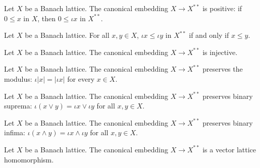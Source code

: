 \begin{theorem}
\label{thm:bidualSpace-inclusion-nonneg}
\leanok
{}
Let $X$ be a Banach lattice. The canonical embedding $X \to
X^{**}$ is positive: if $0 \le x$ in $X$, then $0 \le \iota x$
in $X^{**}$.
\end{theorem}

\begin{theorem}
\label{thm:bidualSpace-inclusion-le-inclusion-iff}
\leanok
{}
Let $X$ be a Banach lattice. For all $x, y \in X$, $\iota x \le
\iota y$ in $X^{**}$ if and only if $x \le y$.
\end{theorem}

\begin{theorem}
\label{thm:bidualSpace-inclusion-injective}
\leanok
{}
Let $X$ be a Banach lattice. The canonical embedding $X \to
X^{**}$ is injective.
\end{theorem}

\begin{theorem}
\label{thm:bidualSpace-inclusion-abs}
\leanok
{}
Let $X$ be a Banach lattice. The canonical embedding $X \to
X^{**}$ preserves the modulus: $\iota \lvert x \rvert = \lvert
\iota x \rvert$ for every $x \in X$.
\end{theorem}

\begin{theorem}
\label{thm:bidualSpace-inclusion-sup}
\leanok
{}
Let $X$ be a Banach lattice. The canonical embedding $X \to
X^{**}$ preserves binary suprema: $\iota (x \vee y) = \iota x
\vee \iota y$ for all $x, y \in X$.
\end{theorem}

\begin{theorem}
\label{thm:bidualSpace-inclusion-inf}
\leanok
{}
Let $X$ be a Banach lattice. The canonical embedding $X \to
X^{**}$ preserves binary infima: $\iota (x \wedge y) = \iota x
\wedge \iota y$ for all $x, y \in X$.
\end{theorem}

\begin{theorem}
\label{thm:bidualSpace-inclusionVecLatHom}
\leanok
{}
Let $X$ be a Banach lattice. The canonical embedding $X \to
X^{**}$ is a vector lattice homomorphism.
\end{theorem}
